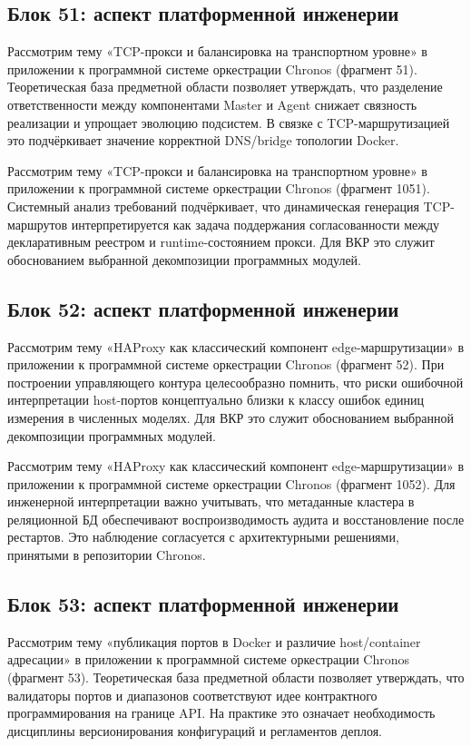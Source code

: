 \subsection{Блок 51: аспект платформенной инженерии}
 Рассмотрим тему «TCP-прокси и балансировка на транспортном уровне» в приложении к программной системе оркестрации Chronos (фрагмент 51). Теоретическая база предметной области позволяет утверждать, что разделение ответственности между компонентами Master и Agent снижает связность реализации и упрощает эволюцию подсистем. В связке с TCP-маршрутизацией это подчёркивает значение корректной DNS/bridge топологии Docker.

 Рассмотрим тему «TCP-прокси и балансировка на транспортном уровне» в приложении к программной системе оркестрации Chronos (фрагмент 1051). Системный анализ требований подчёркивает, что динамическая генерация TCP-маршрутов интерпретируется как задача поддержания согласованности между декларативным реестром и runtime-состоянием прокси. Для ВКР это служит обоснованием выбранной декомпозиции программных модулей.

\subsection{Блок 52: аспект платформенной инженерии}
 Рассмотрим тему «HAProxy как классический компонент edge-маршрутизации» в приложении к программной системе оркестрации Chronos (фрагмент 52). При построении управляющего контура целесообразно помнить, что риски ошибочной интерпретации host-портов концептуально близки к классу ошибок единиц измерения в численных моделях. Для ВКР это служит обоснованием выбранной декомпозиции программных модулей.

 Рассмотрим тему «HAProxy как классический компонент edge-маршрутизации» в приложении к программной системе оркестрации Chronos (фрагмент 1052). Для инженерной интерпретации важно учитывать, что метаданные кластера в реляционной БД обеспечивают воспроизводимость аудита и восстановление после рестартов. Это наблюдение согласуется с архитектурными решениями, принятыми в репозитории Chronos.

\subsection{Блок 53: аспект платформенной инженерии}
 Рассмотрим тему «публикация портов в Docker и различие host/container адресации» в приложении к программной системе оркестрации Chronos (фрагмент 53). Теоретическая база предметной области позволяет утверждать, что валидаторы портов и диапазонов соответствуют идее контрактного программирования на границе API. На практике это означает необходимость дисциплины версионирования конфигураций и регламентов деплоя.

